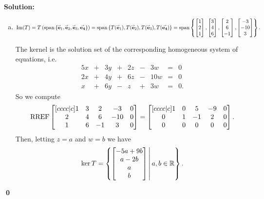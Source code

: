 \documentclass{article}
\newenvironment{solution}
{
  \ignorespaces
  \textbf{Solution:}
}
{
  \ignorespacesafterend
  \begin{flushright}
  {\bfseries \qed}
  \end{flushright}
}
\begin{document}
\begin{solution}
\begin{enumerate}[(a)]
\item 
\[ \operatorname{Im}(T) = T\left(\operatorname{span}\left\{\mathbf{\accentset{\rightharpoonup}{e}}_1,\mathbf{\accentset{\rightharpoonup}{e}}_2,\mathbf{\accentset{\rightharpoonup}{e}}_3,\mathbf{\accentset{\rightharpoonup}{e_4}}\right\}\right)
= \operatorname{span}\left\{T(\mathbf{\accentset{\rightharpoonup}{e}}_1),T(\mathbf{\accentset{\rightharpoonup}{e}}_2),T(\mathbf{\accentset{\rightharpoonup}{e}}_3),T(\mathbf{\accentset{\rightharpoonup}{e_4}})\right\}
= \operatorname{span}\left\{\begin{bmatrix}1 \\ 2 \\ 1 \end{bmatrix}, \begin{bmatrix} 3 \\ 4 \\ 6  \end{bmatrix}, \begin{bmatrix} 2 \\ 6 \\ -1 \end{bmatrix}, \begin{bmatrix} -3 \\ -10 \\ 3 \end{bmatrix}\right\}.\]

The kernel is the solution set of the corresponding homogeneous system of equations, i.e.  
\begin{alignat*}{5}
x &+& 3y &+& 2z &-& 3w &=& 0 \\
2x &+& 4y &+& 6z &-& 10w &=& 0 \\
x &+& 6y &-& z &+& 3w &=& 0 .
\end{alignat*}
So we compute 
\[\operatorname{RREF}\begin{bmatrix}[cccc|c] 1 & 3 & 2 & -3 & 0 \\ 2 & 4 & 6 & -10 &0 \\ 1 & 6 & -1 & 3 & 0 \end{bmatrix}
= \begin{bmatrix}[cccc|c] 1 & 0 & 5 & -9 & 0 \\ 0 & 1 & -1 & 2 & 0  \\ 0 & 0 & 0 & 0 & 0 \end{bmatrix}.\]
Then, letting \(z=a\) and \(w=b\) we have
\[ \ker T = \left\{\begin{bmatrix}-5a+9b \\ a-2b \\ a \\ b \end{bmatrix}\,\middle|\,a,b \in \mathbb{R}\right\}. \]


\end{enumerate}
\end{solution}
\end{document}
